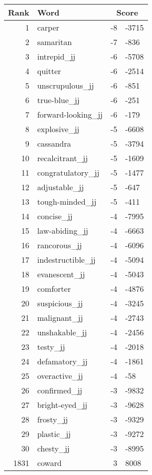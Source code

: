 \begin{longtable}[!htbp]{| rlr@{.}l |}
    \hline
    \textbf{Rank} & \textbf{Word} & \multicolumn{2}{c|}{\textbf{Score}} \\
    \hline
    \endhead
    1 & carper & -8 & -3715 \\
    2 & samaritan & -7 & -836 \\
    3 & intrepid\_jj & -6 & -5708 \\
    4 & quitter & -6 & -2514 \\
    5 & unscrupulous\_jj & -6 & -851 \\
    6 & true-blue\_jj & -6 & -251 \\
    7 & forward-looking\_jj & -6 & -179 \\
    8 & explosive\_jj & -5 & -6608 \\
    9 & cassandra & -5 & -3794 \\
    10 & recalcitrant\_jj & -5 & -1609 \\
    11 & congratulatory\_jj & -5 & -1477 \\
    12 & adjustable\_jj & -5 & -647 \\
    13 & tough-minded\_jj & -5 & -411 \\
    14 & concise\_jj & -4 & -7995 \\
    15 & law-abiding\_jj & -4 & -6663 \\
    16 & rancorous\_jj & -4 & -6096 \\
    17 & indestructible\_jj & -4 & -5094 \\
    18 & evanescent\_jj & -4 & -5043 \\
    19 & comforter & -4 & -4876 \\
    20 & suspicious\_jj & -4 & -3245 \\
    21 & malignant\_jj & -4 & -2743 \\
    22 & unshakable\_jj & -4 & -2456 \\
    23 & testy\_jj & -4 & -2018 \\
    24 & defamatory\_jj & -4 & -1861 \\
    25 & overactive\_jj & -4 & -58 \\
    26 & confirmed\_jj & -3 & -9832 \\
    27 & bright-eyed\_jj & -3 & -9628 \\
    28 & frosty\_jj & -3 & -9329 \\
    29 & plastic\_jj & -3 & -9272 \\
    30 & chesty\_jj & -3 & -8995 \\
    1831 & coward & 3 & 8008 \\

\end{longtable}
